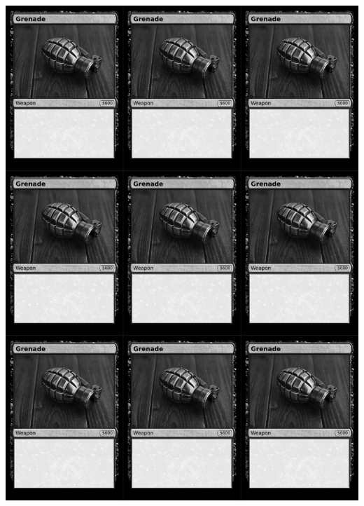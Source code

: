 \documentclass[a4paper]{article}
\begin{document}
\newpage

\begin{center}
	\centering
	\includegraphics[width=200.5mm,height=280.7mm]{output/temp/page8.png}
\end{center}
\end{document}
